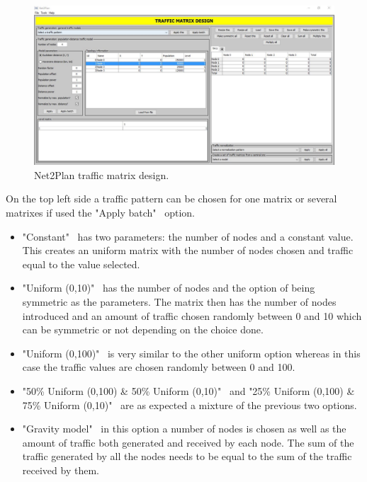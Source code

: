 	\begin{figure}[H]
		\vspace{-0.3cm}
		\centering	
		\includegraphics[width = 16cm]{Net2Plan_traffic.pdf}
		\caption{Net2Plan traffic matrix design.}
		\label{Net2Plan_traffic}
	\end{figure}
		
	On the top left side a traffic pattern can be chosen for one matrix or several matrixes if used the "Apply batch" \ option.
	
	\begin{itemize}	
		
		\item{"Constant" \ has two parameters: the number of nodes and a constant value. This creates an uniform matrix with the number of nodes chosen and traffic equal to the value selected.}
	
		\item{"Uniform (0,10)" \, has the number of nodes and the option of being symmetric as the parameters. The matrix then has the number of nodes introduced and an amount of traffic chosen randomly between 0 and 10 which can be symmetric or not depending on the choice done.}
	
		\item{"Uniform (0,100)" \, is very similar to the other uniform option whereas in this case the traffic values are chosen randomly between 0 and 100.}
	
		\item{"50\% Uniform (0,100) \& 50\% Uniform (0,10)" \, and "25\% Uniform (0,100) \& 75\% Uniform (0,10)" \, are as expected a mixture of the previous two options.}
	
		\item{"Gravity model" \, in this option a number of nodes is chosen as well as the amount of traffic both generated and received by each node. The sum of the traffic generated by all the nodes needs to be equal to the sum of the traffic received by them. }

	\end{itemize}
	
